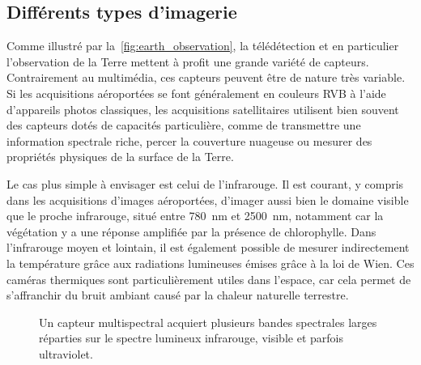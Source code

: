 \subsection{Différents types d'imagerie}

Comme illustré par la~\cref{fig:earth_observation}, la télédétection et en particulier l'observation de la Terre mettent à profit une grande variété de capteurs. Contrairement au multimédia, ces capteurs peuvent être de nature très variable. Si les acquisitions aéroportées se font généralement en couleurs \gls{RVB} à l'aide d'appareils photos classiques, les acquisitions satellitaires utilisent bien souvent des capteurs dotés de capacités particulière, comme de transmettre une information spectrale riche, percer la couverture nuageuse ou mesurer des propriétés physiques de la surface de la Terre.

Le cas plus simple à envisager est celui de l'infrarouge. Il est courant, y compris dans les acquisitions d'images aéroportées, d'imager aussi bien le domaine visible que le proche infrarouge, situé entre \SI{780}{\nano\meter} et \SI{2 500}{\nano\meter}, notamment car la végétation y a une réponse amplifiée par la présence de chlorophylle. Dans l'infrarouge moyen et lointain, il est également possible de mesurer indirectement la température grâce aux radiations lumineuses émises grâce à la loi de Wien. Ces caméras thermiques sont particulièrement utiles dans l'espace, car cela permet de s'affranchir du bruit ambiant causé par la chaleur naturelle terrestre.

\begin{figure}
  \resizebox{\textwidth}{!}{
  
  }
  \caption{Un capteur multispectral acquiert plusieurs bandes spectrales larges réparties sur le spectre lumineux infrarouge, visible et parfois ultraviolet.}
  \label{fig:multispectral}
\end{figure}

